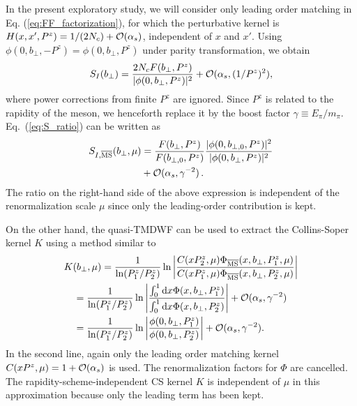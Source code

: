 In the present exploratory study, we will consider only   leading
order matching in Eq. (\ref{eq:FF_factorization}), for which the perturbative
kernel is $H(x,x',P^z)=1/({2N_c})+{\cal O}(\alpha_s)$, independent of $x$ and $x'$.
Using $\phi(0,b_\perp,-P^z)=\phi(0,b_\perp,P^z)$ under parity transformation, we obtain
\begin{align}\label{eq:S_I_z=0}
S_I(b_\perp)=\frac{2N_c F(b_\perp,P^z)}{|\phi(0,b_\perp,P^z)|^2}+{\cal O}(\alpha_s, (1/P^z)^2),
\end{align}
where power corrections from finite $P^z$ are ignored. Since $P^z$ is related
to the rapidity of the meson, we henceforth replace it by the boost factor $\gamma\equiv E_{\pi}/m_{\pi}$.
Eq.~(\ref{eq:S_ratio}) can be written as
\begin{align}\label{eq:S_ratio_z=0}
S_{I,\overline{\rm MS}}(b_\perp,\mu)&=\frac{F(b_\perp,P^z)}{F(b_{\perp,0},P^z)}\frac{|\phi(0,b_{\perp,0},P^z)|^2}{|\phi(0,b_\perp,P^z)|^2}\nonumber\\
&+{\cal O}(\alpha_s, \gamma^{-2})\, .
\end{align}
%
The ratio on the right-hand side of the above expression  is independent of the renormalization scale $\mu$ since only the leading-order contribution is kept.

{On the other hand, the quasi-TMDWF} can be used to extract the Collins-Soper kernel $K$ using a method similar
to~\cite{Ebert:2018gzl}
\begin{align}
&K(b_\perp,\mu)=\frac{1}{\ln(P_1^z/P_2^z)}\ln\left|\frac{C(xP_2^z,\mu) \Phi_{\overline{\rm MS}}(x,b_\perp,P_1^z,\mu)}{C(xP_1^z,\mu) \Phi_{\overline{\rm MS}}(x,b_\perp,P_2^z,\mu)}\right|\label{eq:CS_kernel}\\
&\quad=\frac{1}{\ln(P_1^z/P_2^z)}\ln\left|\frac{\int_0^1 \textrm{d}x \Phi(x,b_\perp,P_1^z)}{\int_0^1 \textrm{d}x \Phi(x,b_\perp,P_2^z)}\right|+{\cal O}(\alpha_s, \gamma^{-2})\nonumber\\
&\quad=\frac{1}{\ln(P_1^z/P_2^z)}\ln\left|\frac{\phi(0,b_\perp,P_1^z)}{\phi(0,b_\perp,P_2^z)}\right|+{\cal O}(\alpha_s, \gamma^{-2})\label{eq:CS_kernel_z=0}. 
\end{align}
%
{In the second line,  again only the leading order matching kernel $C(xP^z,\mu)=1+{\cal O}(\alpha_s)$ is used. }
The  renormalization factors for $\Phi$ are cancelled.
%
The rapidity-scheme-independent CS kernel $K$ is independent of $\mu$ in this approximation because only the leading term has been kept.

